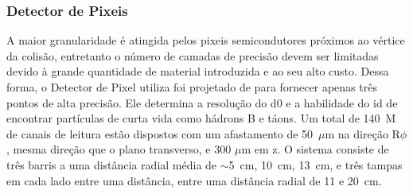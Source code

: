 \begin{table}
\centering
{}
\caption[Parâmetros do ID]
{Parâmetros do ID. As resoluções estão citadas em valores típicos (a
resolução verdadeira em cada detector depende do ângulo de impacto). Adaptado de
\cite{ATLAS_TDR}.}
\label{tab:info_id}
\end{table}

\subsubsection{Detector de Pixeis}
\label{sssec:pixeis}

A maior granularidade é atingida pelos pixeis semicondutores próximos
ao vértice da colisão, entretanto o número de camadas de precisão devem ser
limitadas devido à grande quantidade de material introduzida e ao seu alto
custo. Dessa forma, o Detector de Pixel utiliza foi projetado de para
fornecer apenas três pontos de alta precisão. Ele determina a resolução do
\gls{d0} e a habilidade do \gls{id} de encontrar partículas de curta
vida como hádrons B e táons. Um total de 140~M de canais de
leitura estão dispostos com um afastamento de 50~$\mu$m na direção R$\phi$, 
mesma direção que o plano transverso, e 300 $\mu$m em z. 
O sistema consiste de três barris a uma distância radial
média de $\sim$5~cm, 10~cm, 13~cm, e três tampas em cada lado entre uma
distância, entre uma distância radial de 11 e 20~cm.

